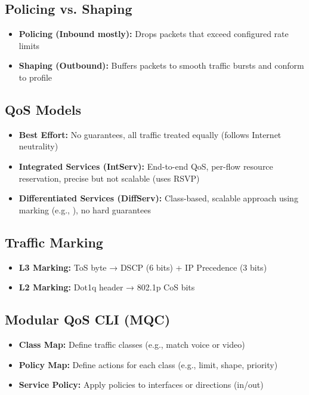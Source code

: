 \begin{multicols*}{5}
		\subsection{Policing vs. Shaping}
		\begin{itemize}
			\item \textbf{Policing (Inbound mostly):} Drops packets that exceed configured rate limits
			\item \textbf{Shaping (Outbound):} Buffers packets to smooth traffic bursts and conform to profile
		\end{itemize}
		
		\subsection{QoS Models}
		\begin{itemize}
			\item \textbf{Best Effort:} No guarantees, all traffic treated equally (follows Internet neutrality)
			\item \textbf{Integrated Services (IntServ):} End-to-end QoS, per-flow resource reservation, precise but not scalable (uses RSVP)
			\item \textbf{Differentiated Services (DiffServ):} Class-based, scalable approach using marking (e.g., ), no hard guarantees
		\end{itemize}
		
		\subsection{Traffic Marking}
		\begin{itemize}
			\item \textbf{L3 Marking:} ToS byte → DSCP (6 bits) + IP Precedence (3 bits)
			\item \textbf{L2 Marking:} Dot1q header → 802.1p CoS bits
		\end{itemize}
		
		\subsection{Modular QoS CLI (MQC)}
		\begin{itemize}
			\item \textbf{Class Map:} Define traffic classes (e.g., match voice or video)
			\item \textbf{Policy Map:} Define actions for each class (e.g., limit, shape, priority)
			\item \textbf{Service Policy:} Apply policies to interfaces or directions (in/out)
		\end{itemize}

\end{multicols*}
